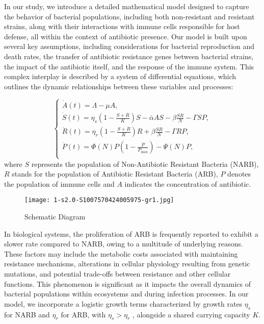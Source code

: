 In our study, we introduce a detailed mathematical model designed to capture the behavior of bacterial populations,
including both non-resistant and resistant strains, along with their interactions with immune cells responsible for host defense, all
within the context of antibiotic presence. Our model is built upon several key assumptions, including considerations for bacterial reproduction and death rates, the transfer of antibiotic resistance genes between bacterial strains, the impact of the antibiotic itself,
and the response of the immune system. This complex interplay is described by a system of differential equations, which outlines
the dynamic relationships between these variables and processes:

\begin{equation}
	\begin{cases}
		\dot{A}(t)  =  \Lambda - \mu A, \\
		\dot{S}(t)  =  \eta_s\left(1 - \frac{S+R}{K}\right)S - \bar{\alpha}AS - \beta\frac{SR}{N} - \Gamma SP, \\
		\dot{R}(t)  =  \eta_r\left(1 - \frac{S+R}{K}\right)R + \beta\frac{SR}{N} - \Gamma RP, \\
		\dot{P}(t)  =  \Phi(N)P\left(1 - \frac{P}{P_{\max}}\right) - \Psi(N)P, \\
	\end{cases}
\end{equation}
where $S$ represents the population of Non-Antibiotic Resistant Bacteria (NARB), $R$ stands for the population of Antibiotic Resistant
Bacteria (ARB), $P$ denotes the population of immune cells and $A$ indicates the concentration of antibiotic.

\begin{figure}
	\centering
	\texttt{[image: 1-s2.0-S1007570424005975-gr1.jpg]}
	\caption{Schematic Diagram}
\end{figure}

In biological systems, the proliferation of ARB is frequently reported to exhibit a slower rate compared to NARB, owing to
a multitude of underlying reasons. These factors may include the metabolic costs associated with maintaining resistance
mechanisms, alterations in cellular physiology resulting from genetic mutations, and potential trade-offs between resistance and
other cellular functions. This phenomenon is significant as it impacts the overall dynamics of bacterial populations within ecosystems
and during infection processes. In our model, we incorporate a logistic growth terms characterized by growth rates $\eta_s$ for NARB and
$\eta_r$ for ARB, with $\eta_s > \eta_r$ , alongside a shared carrying capacity $K$.

